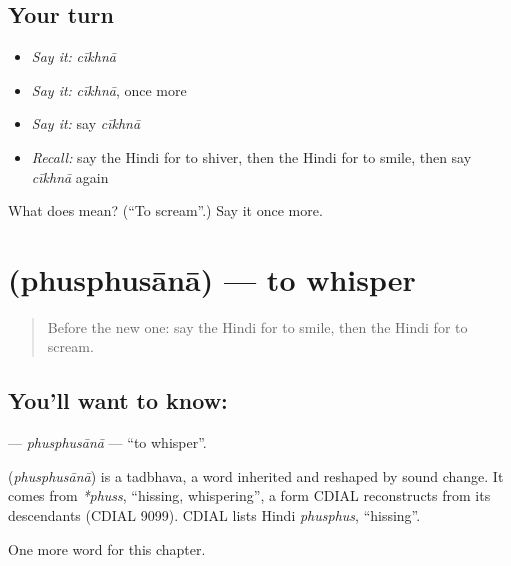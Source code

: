 \subsection*{Your turn}
\begin{itemize}
\raggedright
  \item \emph{Say it:} \emph{cīkhnā}
  \item \emph{Say it:} \emph{cīkhnā}, once more
  \item \emph{Say it:} say \emph{cīkhnā}
  \item \emph{Recall:} say the Hindi for to shiver, then the Hindi for to smile, then say \emph{cīkhnā} again
\end{itemize}

\begin{tcolorbox}[breakable,colback=teal!4,colframe=teal!35!black,title={Before you move on}]
What does  mean? (\textquotedblleft{}To scream\textquotedblright{}.) Say it once more.
\end{tcolorbox}
\section[\texorpdfstring{\hi{फुसफुसाना} (phusphusānā)}{फुसफुसाना (phusphusānā)}]{ (phusphusānā) — to whisper}

\label{lesson:HI-C232-phusphusana}



\begin{quote}
Before the new one: say the Hindi for to smile, then the Hindi for to scream.
\end{quote}

\subsection*{You'll want to know: }
\textbf{} — \emph{phusphusānā} — \textquotedblleft{}to whisper\textquotedblright{}.

\begin{cousinweb}
\textbf{} (\emph{phusphusānā}) is a tadbhava, a word inherited and reshaped by sound change. It comes from \emph{*phuss}, \textquotedblleft{}hissing, whispering\textquotedblright{}, a form CDIAL reconstructs from its descendants (CDIAL 9099). CDIAL lists Hindi \emph{phusphus}, \textquotedblleft{}hissing\textquotedblright{}.
\end{cousinweb}

\begin{grammarlens}[title={What you've built}]
One more word for this chapter.
\end{grammarlens}

